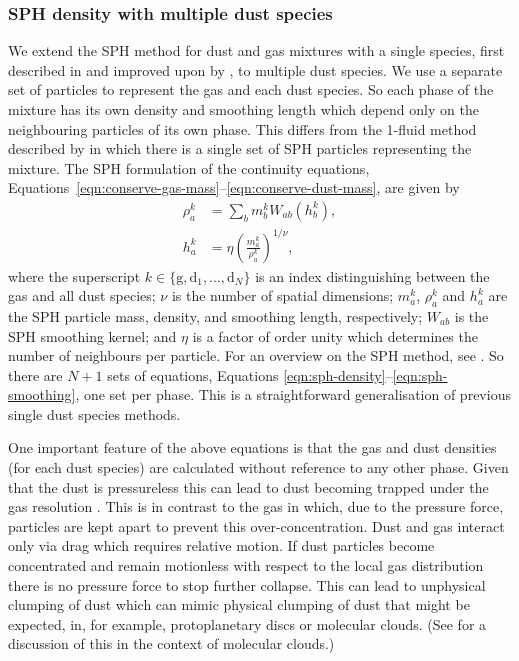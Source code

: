 \documentclass[fleqn,usenatbib]{mnras}
\newcommand{\g}{\mathrm{g}}
\newcommand{\dd}{\mathrm{d}}
\begin{document}
\subsubsection{SPH density with multiple dust species}

We extend the SPH method for dust and gas mixtures with a single species, first
described in \citet{Monaghan1995CoPhC..87..225M} and improved upon by
\citet{Laibe2012MNRAS.420.2345L,Laibe2012MNRAS.420.2365L}, to multiple dust
species. We use a separate set of particles to represent the gas and each dust
species. So each phase of the mixture has its own density and smoothing length
which depend only on the neighbouring particles of its own phase. This differs
from the 1-fluid method described by \citet{Hutchison2018MNRAS.476.2186H} in
which there is a single set of SPH particles representing the mixture. The SPH
formulation of the continuity equations,
Equations~\ref{eqn:conserve-gas-mass}--\ref{eqn:conserve-dust-mass}, are given
by
%
\begin{align}
   \label{eqn:sph-density}
   \rho^k_a &= \sum_b m^k_b W_{ab}(h^k_b), \\
   h^k_a &= \eta \left(\frac{m^k_a}{\rho^k_a}\right)^{1/\nu},
   \label{eqn:sph-smoothing}
\end{align}
%
where the superscript \(k \in \{\g, \dd_1, \dots, \dd_N\}\) is an index
distinguishing between the gas and all dust species; \(\nu\) is the number of
spatial dimensions; \(m^k_a\), \(\rho^k_a\) and \(h^k_a\) are the SPH particle
mass, density, and smoothing length, respectively; \(W_{ab}\) is the SPH
smoothing kernel; and \(\eta\) is a factor of order unity which determines the
number of neighbours per particle. For an overview on the SPH method, see
\citet{Monaghan1992ARA&A..30..543M, Monaghan2005RPPh...68.1703M,
Price2012JCoPh.231..759P}. So there are \(N + 1\) sets of equations, Equations
\ref{eqn:sph-density}--\ref{eqn:sph-smoothing}, one set per phase. This is a
straightforward generalisation of previous single dust species methods.

One important feature of the above equations is that the gas and dust densities
(for each dust species) are calculated without reference to any other phase.
Given that the dust is pressureless this can lead to dust becoming trapped under
the gas resolution \citep{Laibe2012MNRAS.420.2345L}. This is in contrast to the
gas in which, due to the pressure force, particles are kept apart to prevent
this over-concentration. Dust and gas interact only via drag which requires
relative motion. If dust particles become concentrated and remain motionless
with respect to the local gas distribution there is no pressure force to stop
further collapse. This can lead to unphysical clumping of dust which can mimic
physical clumping of dust that might be expected, in, for example,
protoplanetary discs or molecular clouds. (See
\citealt{Tricco2017MNRAS.471L..52T} for a discussion of this in the context of
molecular clouds.)
\end{document}
